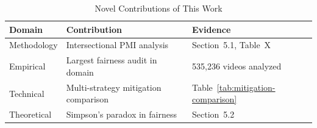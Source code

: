 \begin{table}[!t]
\centering
\caption{Novel Contributions of This Work}
\begin{tabular}{lll}
\toprule
\textbf{Domain} & \textbf{Contribution} & \textbf{Evidence} \\
\midrule
Methodology & Intersectional PMI analysis & Section~5.1, Table~X \\
Empirical   & Largest fairness audit in domain & 535{,}236 videos analyzed \\
Technical   & Multi-strategy mitigation comparison & Table~\ref{tab:mitigation-comparison} \\
Theoretical & Simpson's paradox in fairness & Section~5.2 \\
\bottomrule
\end{tabular}
\end{table}
